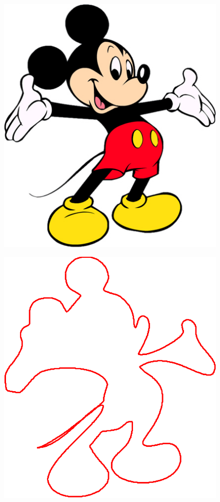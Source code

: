 \documentclass[10pt]{article}
\begin{document}
\begin{figure}
\begin{minipage}[t]{.24\textwidth}
    \label{fig:cornerdet}
\end{minipage}\hfill
\begin{minipage}[t]{.24\textwidth}
\centering
\vspace{0pt}
    \includegraphics[scale=0.3]{mickey2.jpg}
    \label{fig:cornerdet}
\end{minipage}
\begin{minipage}[t]{.24\textwidth}
\centering
\vspace{0pt}
    \includegraphics[scale=0.3]{mickey2-crop.pdf}

\end{minipage}
\end{figure}
\end{document}

